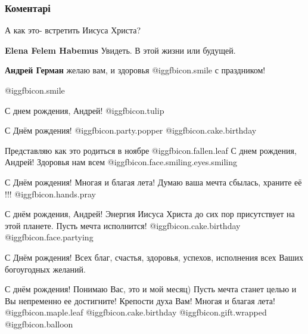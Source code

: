  
 
 
 
 
\subsubsection{Коментарі}

\begin{itemize} %
А как это- встретить Иисуса Христа?

\begin{itemize} %
\textbf{Elena Felem Habemus} Увидеть. В этой жизни или будущей.

\textbf{Андрей Герман} желаю вам, и здоровья  @igg{fbicon.smile}  с праздником!
\end{itemize} %

 @igg{fbicon.smile} 

С днем рождения, Андрей!  @igg{fbicon.tulip} 

С Днём рождения!  @igg{fbicon.party.popper}  @igg{fbicon.cake.birthday} 

Представляю как это родиться в ноябре  @igg{fbicon.fallen.leaf} 
С днем рождения, Андрей! Здоровья нам всем  @igg{fbicon.face.smiling.eyes.smiling} 

С Днём рождения! Многая и благая лета! Думаю ваша мечта сбылась, храните её !!! @igg{fbicon.hands.pray} 

С днём рождения, Андрей! Энергия Иисуса Христа до сих пор присутствует на этой планете. Пусть мечта исполнится!  @igg{fbicon.cake.birthday}  @igg{fbicon.face.partying} 

С Днём рождения! Всех благ, счастья, здоровья, успехов, исполнения всех Ваших богоугодных желаний.

С днём рождения!
Понимаю Вас, это и мой месяц)
Пусть мечта станет целью и Вы непременно ее достигните! Крепости духа Вам! Многая и благая лета!  @igg{fbicon.maple.leaf}  @igg{fbicon.cake.birthday}  @igg{fbicon.gift.wrapped}  @igg{fbicon.balloon} 


\end{itemize}
